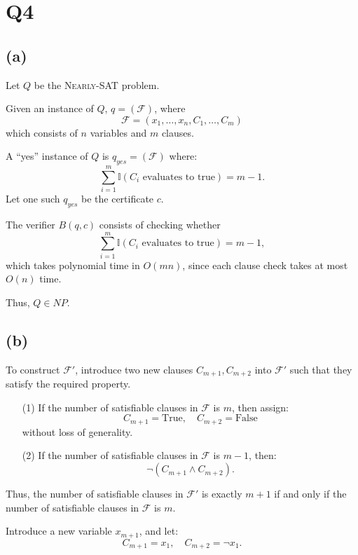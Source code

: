 \section*{Q4}


\subsection*{(a)}
Let \( Q \) be the \textsc{Nearly-SAT} problem.

Given an instance of \( Q \), \( q = (\mathcal{F}) \), where 
\[
\mathcal{F} = (x_1, \dots, x_n, C_1, \dots, C_m)
\]
which consists of \( n \) variables and \( m \) clauses.

A ``yes'' instance of \( Q \) is \( q_{yes} = (\mathcal{F}) \) where:
\[
\sum_{i=1}^{m} \mathbb{I}(C_i \text{ evaluates to true}) = m - 1.
\]
Let one such \( q_{yes} \) be the certificate \( c \).

The verifier \( B(q, c) \) consists of checking whether 
\[
\sum_{i=1}^{m} \mathbb{I}(C_i \text{ evaluates to true}) = m - 1,
\]
which takes polynomial time in \( O(mn) \), since each clause check takes at most \( O(n) \) time.

Thus, \( Q \in NP \).

\subsection*{(b)}
To construct \( \mathcal{F}' \), introduce two new clauses \( C_{m+1}, C_{m+2} \) into \( \mathcal{F}' \) such that they satisfy the required property.

\begin{enumerate}
    \item[(1)] If the number of satisfiable clauses in \( \mathcal{F} \) is \( m \), then assign:
    \[
    C_{m+1} = \text{True}, \quad C_{m+2} = \text{False}
    \]
    without loss of generality.
    
    \item[(2)] If the number of satisfiable clauses in \( \mathcal{F} \) is \( m - 1 \), then:
    \[
    \neg (C_{m+1} \land C_{m+2}).
    \]
\end{enumerate}

Thus, the number of satisfiable clauses in \( \mathcal{F}' \) is exactly \( m + 1 \) if and only if the number of satisfiable clauses in \( \mathcal{F} \) is \( m \).

Introduce a new variable \( x_{m+1} \), and let:
\[
C_{m+1} = x_{1}, \quad C_{m+2} = \neg x_{1}.
\]


